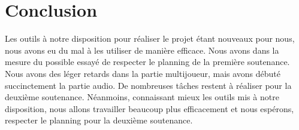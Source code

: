 \documentclass[a4paper, 12pt]{article}
\begin{document}
\section{Conclusion}

Les outils à notre disposition pour réaliser le projet étant  nouveaux pour nous, nous avons eu du mal à les utiliser de manière efficace. Nous avons dans la mesure du possible essayé de respecter le planning de la première soutenance. Nous avons des l\'eger retards dans la partie multijoueur, mais avons d\'ebut\'e succinctement la partie audio. De nombreuses tâches restent à réaliser pour la deuxième soutenance. Néanmoins, connaissant mieux les outils mis à notre disposition, nous allons travailler beaucoup plus efficacement et nous espérons, respecter le planning pour la deuxième soutenance. 
\end{document}

